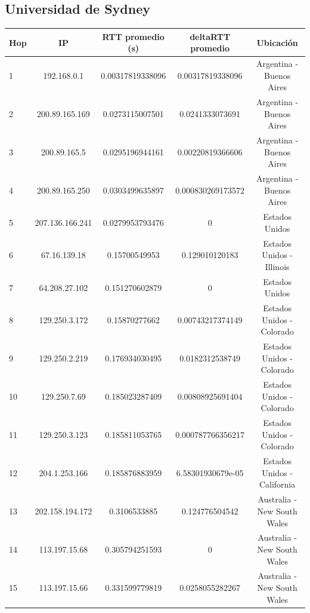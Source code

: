 \subsection{Universidad de Sydney}

\bigskip

\begin{tabular}{ | l | c | c | c | c |}
 
  \hline                 
  Hop & IP &  RTT promedio (s)  & deltaRTT promedio & Ubicación\\
  \hline
  1  &  192.168.0.1  &  0.00317819338096  &  0.00317819338096 & Argentina - Buenos Aires\\
  \hline
  2  &  200.89.165.169  &  0.0273115007501  &  0.0241333073691 & Argentina - Buenos Aires\\
  \hline
  3  &  200.89.165.5  &  0.0295196944161  &  0.00220819366606 & Argentina - Buenos Aires\\
  \hline
  4  &  200.89.165.250  &  0.0303499635897  &  0.000830269173572 & Argentina - Buenos Aires\\
  \hline
  5  &  207.136.166.241  &  0.0279953793476  &  0 & Estados Unidos\\
  \hline
  6  &  67.16.139.18  &  0.15700549953  &  0.129010120183 & Estados Unidos - Illinois\\
  \hline
  7  &  64.208.27.102  &  0.151270602879  &  0 & Estados Unidos\\
  \hline
  8  &  129.250.3.172  &  0.15870277662  &  0.00743217374149 & Estados Unidos - Colorado\\
  \hline
  9  &  129.250.2.219  &  0.176934030495  &  0.0182312538749 & Estados Unidos - Colorado\\
  \hline
  10  &  129.250.7.69  &  0.185023287409  &  0.00808925691404 & Estados Unidos - Colorado\\
  \hline
  11  &  129.250.3.123  &  0.185811053765  &  0.000787766356217 & Estados Unidos - Colorado\\
  \hline
  12  &  204.1.253.166  &  0.185876883959  &  6.58301930679e-05 & Estados Unidos - California\\
  \hline
  13  &  202.158.194.172  &  0.3106533885  &  0.124776504542 & Australia - New South Wales\\
  \hline
  14  &  113.197.15.68  &  0.305794251593  &  0 & Australia - New South Wales\\
  \hline
  15  &  113.197.15.66  &  0.331599779819  &  0.0258055282267 & Australia - New South Wales\\
  \hline

\end{tabular}
